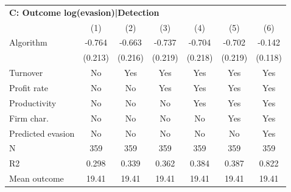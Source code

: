 \begin{tabular}{lcccccc}
\midrule \multicolumn{7}{l}{\textbf{C: Outcome log(evasion)|Detection}} \\ \multicolumn{1}{l}{} & (1) & (2) & (3) & (4) & (5) & (6) \\ \midrule
Algorithm   &      -0.764\sym{***}&      -0.663\sym{***}&      -0.737\sym{***}&      -0.704\sym{***}&      -0.702\sym{***}&      -0.142         \\
            &     (0.213)         &     (0.216)         &     (0.219)         &     (0.218)         &     (0.219)         &     (0.118)         \\
\midrule
Turnover    &          No         &         Yes         &         Yes         &         Yes         &         Yes         &         Yes         \\
Profit rate &          No         &          No         &         Yes         &         Yes         &         Yes         &         Yes         \\
Productivity&          No         &          No         &          No         &         Yes         &         Yes         &         Yes         \\
Firm char.  &          No         &          No         &          No         &          No         &         Yes         &         Yes         \\
Predicted evasion&          No         &          No         &          No         &          No         &          No         &         Yes         \\
N           &         359         &         359         &         359         &         359         &         359         &         359         \\
R2          &       0.298         &       0.339         &       0.362         &       0.384         &       0.387         &       0.822         \\
Mean outcome&       19.41         &       19.41         &       19.41         &       19.41         &       19.41         &       19.41         \\
\bottomrule \end{tabular}
